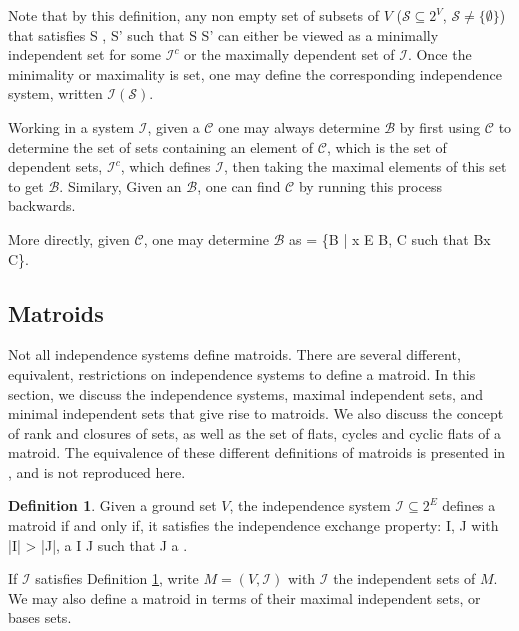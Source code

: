 \documentclass[11pt]{article}
\def\ba #1\ea{\begin{align} #1 \end{align}}
\def\bas #1\eas{\begin{align*} #1 \end{align*}}
\newcommand{\sI}{\mathscr{I}}
\newcommand{\cI}{\mathcal{I}}
\newcommand{\sC}{\mathscr{C}}
\newcommand{\sB}{\mathscr{B}}
\newcommand{\sS}{\mathscr{S}}
\theoremstyle{remark}
\theoremstyle{definition}
\newtheorem{dfn}[thm]{Definition}
\begin{document}
Note that by this definition, any non empty set of subsets of $V$ ($\sS \subseteq 2^V$, $\sS \neq \{\emptyset\}$) that satisfies \ba \forall S \in \sS, \; \not \exists S' \in \sS \textrm{ such that } S \subseteq S' \label{eqn:minmaxset}\ea can either be viewed as a minimally independent set for some $\sI^c$ or the maximally dependent set of $\sI$. Once the minimality or maximality is set, one may define the corresponding independence system, written $\sI(\sS)$.

Working in a system $\sI$, given a $\sC$ one may always determine $\sB$ by first using $\sC$ to determine the set of sets containing an element of $\sC$, which is the set of dependent sets, $\sI^c$, which defines $\sI$, then taking the maximal elements of this set to get $\sB$. Similary, Given an $\sB$, one can find $\sC$ by running this process backwards.

More directly, given $\sC$, one may determine $\sB$ as \bas \sB = \{B \in \cI| \forall x \in E \setminus B, \exists C \in \sC \textrm{ such that } B\cup x \supseteq C\}\;. \eas


\subsection{Matroids}

Not all independence systems define matroids. There are several different, equivalent, restrictions on independence systems to define a matroid. In this section, we discuss the independence systems, maximal independent sets, and minimal independent sets that give rise to matroids. We also discuss the concept of rank and closures of sets, as well as the set of flats, cycles and cyclic flats of a matroid. The equivalence of these different definitions of matroids is presented in \cite{OxleyMatroidBook}, and is not reproduced here.

\begin{dfn} \label{dfn:matroidindependence}Given a ground set $V$, the independence system $\sI \subseteq 2^E$ defines a matroid if and only if, it satisfies the independence exchange property: \ba \forall I,\; J \in \sI \textrm{ with } |I| > |J|, \; \exists a \in I \setminus J \textrm{ such that } J \cup a \in \sI \;.\label{eq:indepexchange} \ea 
\end{dfn}

If $\sI$ satisfies Definition \ref{dfn:matroidindependence}, write $M = (V, \sI)$ with $\sI$ the independent sets of $M$. We may also define a matroid in terms of their maximal independent sets, or bases sets. 
\end{document}
